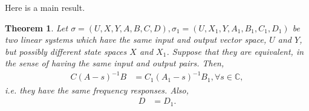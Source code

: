 \documentclass[12pt]{book}
\theoremstyle{plain}
\newtheorem{theorem}{Theorem}[section]
\theoremstyle{definition}
\begin{document}
Here is a main result.

\begin{theorem} \label{thm:Equivalence1}
    Let $\sigma = (U, X, Y, A, B, C, D), \sigma_1 = (U, X_1, Y, A_1, B_1, C_1, D_1)$ be two linear systems which have the same input and output vector space, $U$ and $Y$, but possibly different state spaces $X$ and $X_1$.
    Suppose that they are equivalent, in the sense of having the same input and output pairs.
    Then,
    \begin{align}
        C(A-s)^{-1}B &= C_1(A_1-s)^{-1}B_1, \forall s \in \mathbb{C},
    \end{align}
    i.e. they have the same frequency responses.
    Also,
    \begin{align}
        D &= D_1.
    \end{align}
\end{theorem}
\end{document}
